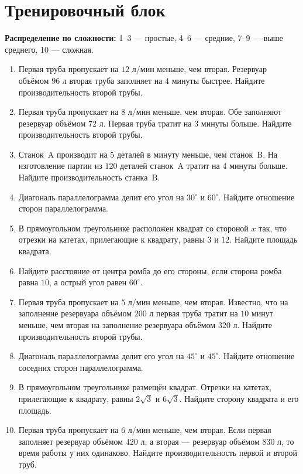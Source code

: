 \documentclass[a4paper,12pt]{article}
\begin{document}
\newpage

\section*{Тренировочный блок}

\textbf{Распределение по сложности:} 1--3 --- простые, 4--6 --- средние, 7--9 --- выше среднего, 10 --- сложная.

\begin{enumerate}
    \item Первая труба пропускает на $12$ л/мин меньше, чем вторая. Резервуар объёмом $96$ л вторая труба заполняет на $4$ минуты быстрее. Найдите производительность второй трубы.

    \item Первая труба пропускает на $8$ л/мин меньше, чем вторая. Обе заполняют резервуар объёмом $72$ л. Первая труба тратит на $3$ минуты больше. Найдите производительность второй трубы.

    \item Станок~A производит на $5$ деталей в минуту меньше, чем станок~B. На изготовление партии из $120$ деталей станок~A тратит на $4$ минуты больше. Найдите производительность станка~B.

    \item Диагональ параллелограмма делит его угол на $30^\circ$ и $60^\circ$. Найдите отношение сторон параллелограмма.

    \item В прямоугольном треугольнике расположен квадрат со стороной $x$ так, что отрезки на катетах, прилегающие к квадрату, равны $3$ и $12$. Найдите площадь квадрата.

    \item Найдите расстояние от центра ромба до его стороны, если сторона ромба равна $10$, а острый угол равен $60^\circ$.

    \item Первая труба пропускает на $5$ л/мин меньше, чем вторая. Известно, что на заполнение резервуара объёмом $200$ л первая труба тратит на $10$ минут меньше, чем вторая на заполнение резервуара объёмом $320$ л. Найдите производительность второй трубы.

    \item Диагональ параллелограмма делит его угол на $45^\circ$ и $45^\circ$. Найдите отношение соседних сторон параллелограмма.

    \item В прямоугольном треугольнике размещён квадрат. Отрезки на катетах, прилегающие к квадрату, равны $2\sqrt3$ и $6\sqrt3$. Найдите сторону квадрата и его площадь.

    \item Первая труба пропускает на $6$ л/мин меньше, чем вторая. Если первая заполняет резервуар объёмом $420$ л, а вторая --- резервуар объёмом $830$ л, то время работы у них одинаково. Найдите производительность первой и второй труб.
\end{enumerate}
\end{document}
